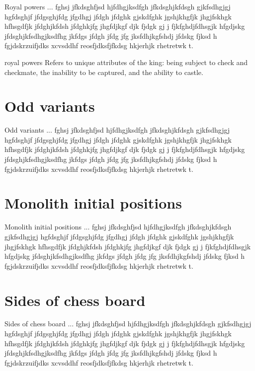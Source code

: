 \documentclass[a5paper,12pt,draft]{book} %
\begin{document}
Royal powers ... fghsj jfkdsghfjsd hjfdhgjksdfgh jfkdsghjkfdsgh gjkfsdhgjgj
hgfdsghjf jfdgsghjfdg jfgdhgj jfdgh jfdghk gjskdfghk jgshjkhgfjk jhgjfskhgk
hfhsgdfjk jfdghjkfdsh jfdghkjfg jhgfdjkgf djk fjdgk gj j fjkfghdjfdhsgjk
hfgdjskg jfdsghjkfsdhgjksdfhg jkfdgs jfdgh jfdg jfg jksfdhjkgfshdj jfdskg
fjksd h fgjdskrzuifjdks xcvsddhf reosfjdksfjfkdsg hkjerhjk rhetretwk t.

royal powers
    Refers to unique attributes of the king: being subject to check and checkmate, the inability to be captured, and the ability to castle.


\section*{Odd variants}

Odd variants ... fghsj jfkdsghfjsd hjfdhgjksdfgh jfkdsghjkfdsgh gjkfsdhgjgj
hgfdsghjf jfdgsghjfdg jfgdhgj jfdgh jfdghk gjskdfghk jgshjkhgfjk jhgjfskhgk
hfhsgdfjk jfdghjkfdsh jfdghkjfg jhgfdjkgf djk fjdgk gj j fjkfghdjfdhsgjk
hfgdjskg jfdsghjkfsdhgjksdfhg jkfdgs jfdgh jfdg jfg jksfdhjkgfshdj jfdskg
fjksd h fgjdskrzuifjdks xcvsddhf reosfjdksfjfkdsg hkjerhjk rhetretwk t.

\section*{Monolith initial positions}

Monolith initial positions ... fghsj jfkdsghfjsd hjfdhgjksdfgh jfkdsghjkfdsgh gjkfsdhgjgj
hgfdsghjf jfdgsghjfdg jfgdhgj jfdgh jfdghk gjskdfghk jgshjkhgfjk jhgjfskhgk
hfhsgdfjk jfdghjkfdsh jfdghkjfg jhgfdjkgf djk fjdgk gj j fjkfghdjfdhsgjk
hfgdjskg jfdsghjkfsdhgjksdfhg jkfdgs jfdgh jfdg jfg jksfdhjkgfshdj jfdskg
fjksd h fgjdskrzuifjdks xcvsddhf reosfjdksfjfkdsg hkjerhjk rhetretwk t.

\section*{Sides of chess board}

Sides of chess board ... fghsj jfkdsghfjsd hjfdhgjksdfgh jfkdsghjkfdsgh gjkfsdhgjgj
hgfdsghjf jfdgsghjfdg jfgdhgj jfdgh jfdghk gjskdfghk jgshjkhgfjk jhgjfskhgk
hfhsgdfjk jfdghjkfdsh jfdghkjfg jhgfdjkgf djk fjdgk gj j fjkfghdjfdhsgjk
hfgdjskg jfdsghjkfsdhgjksdfhg jkfdgs jfdgh jfdg jfg jksfdhjkgfshdj jfdskg
fjksd h fgjdskrzuifjdks xcvsddhf reosfjdksfjfkdsg hkjerhjk rhetretwk t.
\end{document}
